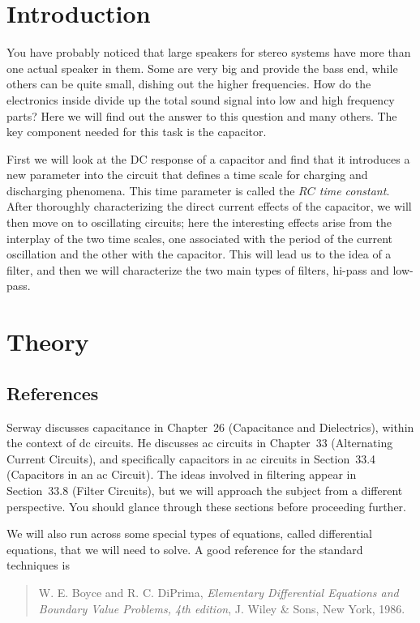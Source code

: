 \section{Introduction}

You have probably noticed that large speakers for stereo systems have more 
than one actual speaker in them. Some are very big and provide the bass end, 
while others can be quite small, dishing out the higher frequencies. How do 
the electronics inside divide up the total sound signal into low and high 
frequency parts? Here we will find out the answer to this question and many
others. The key component needed for this task is the capacitor.

First we will look at the DC response of a capacitor and find that it 
introduces a new parameter into the circuit that defines a time scale for 
charging and discharging phenomena. This time parameter is called the {\em 
$RC$ time constant}. After thoroughly characterizing the direct current effects
of the capacitor, we will then move on to oscillating circuits; here the 
interesting effects arise from the interplay of the two time scales, one 
associated with the period of the current oscillation and the other with 
the capacitor. This will lead us to the idea of a filter, and then we will 
characterize the two main types of filters, hi-pass and low-pass.

\section{Theory}

\subsection{References}

Serway discusses capacitance in Chapter~26 (Capacitance and Dielectrics), 
within the context of dc circuits. He discusses ac circuits in 
Chapter~33 (Alternating Current Circuits), and specifically capacitors 
in ac circuits in Section~33.4 (Capacitors in an ac Circuit). The ideas
involved in filtering appear in Section~33.8 (Filter Circuits), but we 
will approach the subject from a different perspective. You should glance 
through these sections before proceeding further.

We will also run across some special types of equations, called differential 
equations, that we will need to solve. A good reference for the standard 
techniques is 
\begin{quote}
W. E. Boyce and R. C. DiPrima, {\it Elementary Differential Equations and 
Boundary Value Problems, 4th edition}, J. Wiley \& Sons, New York, 1986.
\end{quote}

